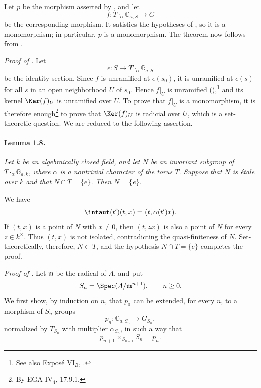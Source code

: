Let \(p\) be the morphism asserted by , and let
\[
  f\colon T\mathbin{\cdot_\alpha}\mathbb G_{a,S}\longrightarrow G
\]
be the corresponding morphism. It satisfies the hypotheses of ,
so it is a monomorphism; in particular, \(p\) is a monomorphism.
The theorem now follows from .

\medskip
\noindent\emph{Proof of .}
Let
\[
  \epsilon\colon S\longrightarrow
    T\mathbin{\cdot_\alpha}\mathbb G_{a,S}
\]
be the identity section. Since \(f\) is unramified at
\(\epsilon(s_0)\), it is unramified at \(\epsilon(s)\) for all
\(s\) in an open neighborhood \(U\) of \(s_0\). Hence \(f|_U\) is
unramified \textup{()},\footnote{See also Exposé
VI\(_B\), .} and its kernel \(\Ker(f)_U\) is unramified over
\(U\). To prove that \(f|_U\) is a monomorphism, it is therefore
enough\footnote{By EGA IV\(_4\), 17.9.1.} to prove that
\(\Ker(f)_U\) is radicial over \(U\), which is a set-theoretic
question. We are reduced to the following assertion.

\paragraph{\textbf{Lemma 1.8.}}
\emph{Let \(k\) be an algebraically closed field, and let \(N\) be
an invariant subgroup of
\(T\mathbin{\cdot_\alpha}\mathbb G_{a,k}\), where \(\alpha\) is a
nontrivial character of the torus \(T\). Suppose that \(N\) is
étale over \(k\) and that \(N\cap T=\{e\}\). Then \(N=\{e\}\).}

We have
\[
  \intaut(t')(t,x)=\bigl(t,\alpha(t')x\bigr).
\]
If \((t,x)\) is a point of \(N\) with \(x\neq0\), then
\((t,zx)\) is also a point of \(N\) for every \(z\in k^\times\).
Thus \((t,x)\) is not isolated, contradicting the quasi-finiteness
of \(N\). Set-theoretically, therefore, \(N\subset T\), and the
hypothesis \(N\cap T=\{e\}\) completes the proof.



\medskip
\noindent\emph{Proof of .}
Let \(\mathfrak m\) be the radical of \(A\), and put
\[
  S_n=\Spec(A/\mathfrak m^{n+1}),\qquad n\geq 0.
\]
We first show, by induction on \(n\), that \(p_0\) can be extended,
for every \(n\), to a morphism of \(S_n\)-groups
\[
  p_n\colon\mathbb G_{a,S_n}\longrightarrow G_{S_n},
\]
normalized by \(T_{S_n}\) with multiplier \(\alpha_{S_n}\), in such
a way that
\[
  p_{n+1}\times_{S_{n+1}}S_n=p_n.
\]

